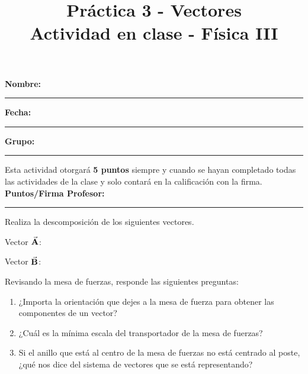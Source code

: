\documentclass[14pt]{extarticle}
\title{\vspace*{-2cm} Práctica 3 - Vectores \\ Actividad en clase - Física III\vspace{-5ex}}
\date{}
\begin{document}
\maketitle

\textbf{Nombre:} \rule{7cm}{0.1mm} \textbf{Fecha:} \rule{3cm}{0.1mm} 

\vspace*{0.4cm}
\textbf{Grupo:} \rule{3cm}{0.1mm}

\vspace{1cm}

\large
Esta actividad otorgará \textbf{5 puntos} siempre y cuando se hayan completado todas las actividades de la clase y solo contará en la calificación con la firma. \hspace{2cm} \textbf{Puntos/Firma Profesor:} \rule{4cm}{0.1mm}

\vspace*{0.5cm}
Realiza la descomposición de los siguientes vectores.

\begin{minipage}[T]{0.4\linewidth}
Vector $\va{A}$:
\begin{figure}[H]
    \centering
\end{figure}
\end{minipage}
\hspace{0.3cm}
\begin{minipage}[t]{0.4\linewidth}
Vector $\va{B}$:
\begin{figure}[H]
    \centering
\end{figure}
\end{minipage}

\vspace*{0.3cm}
Revisando la mesa de fuerzas, responde las siguientes preguntas:
\begin{enumerate}
\item ¿Importa la orientación que dejes a la mesa de fuerza para obtener las componentes de un vector?
\item ¿Cuál es la mínima escala del transportador de la mesa de fuerzas?
\item Si el anillo que está al centro de la mesa de fuerzas no está centrado al poste, ¿qué nos dice del sistema de vectores que se está representando?
\end{enumerate}
\end{document}

